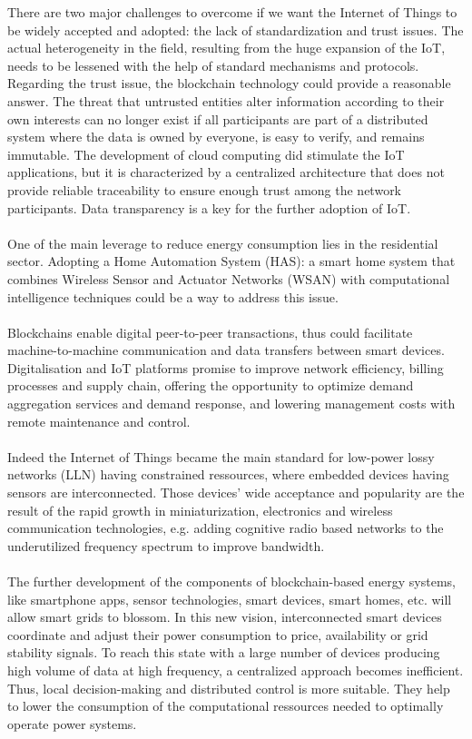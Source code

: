 \documentclass[11pt]{article}
\begin{document}
There are two major challenges to overcome if we want the Internet of Things to be widely accepted and adopted: the lack of standardization and trust issues. The actual heterogeneity in the field, resulting from the huge expansion of the IoT, needs to be lessened with the help of standard mechanisms and protocols. Regarding the trust issue, the blockchain technology could provide a reasonable answer. The threat that untrusted entities alter information according to their own interests can no longer exist if all participants are part of a distributed system where the data is owned by everyone, is easy to verify, and remains immutable. The development of cloud computing did stimulate the IoT applications, but it is characterized by a centralized architecture that does not provide reliable traceability to ensure enough trust among the network participants. Data transparency is a key for the further adoption of IoT.\cite{8}\\\\
One of the main leverage to reduce energy consumption lies in the residential sector. Adopting a Home Automation System (HAS): a smart home system that combines Wireless Sensor and Actuator Networks (WSAN) with computational intelligence techniques could be a way to address this issue.\cite{9}\\\\
Blockchains enable digital peer-to-peer transactions, thus could facilitate machine-to-machine communication and data transfers between smart devices. Digitalisation and IoT platforms promise to improve network efficiency, billing processes and supply chain, offering the opportunity to optimize demand aggregation services and demand response, and lowering management costs with remote maintenance and control.\cite{10}\\\\
Indeed the Internet of Things became the main standard for low-power lossy networks (LLN) having constrained ressources, where embedded devices having sensors are interconnected. Those devices' wide acceptance and popularity are the result of the rapid growth in miniaturization, electronics and wireless communication technologies, e.g. adding cognitive radio based networks to the underutilized frequency spectrum to improve bandwidth.\cite{11}\\\\
The further development of the components of blockchain-based energy systems, like smartphone apps, sensor technologies, smart devices, smart homes, etc. will allow smart grids to blossom. In this new vision, interconnected smart devices coordinate and adjust their power consumption to price, availability or grid stability signals. To reach this state with a large number of devices producing high volume of data at high frequency, a centralized approach becomes inefficient. Thus, local decision-making and distributed control is more suitable. They help to lower the consumption of the computational ressources needed to optimally operate power systems.\cite{10}\\
\end{document}
